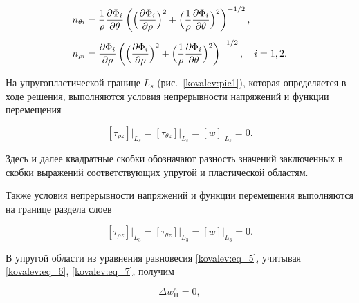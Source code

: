 \begin{equation}\label{kovalev:eq_16}

  \begin{array}{l}

    n_{\theta i}=\dfrac1{\rho}\dfrac{\partial\Phi_i}{\partial\theta}

    \left(\Bigl(\dfrac{\partial\Phi_i}{\partial\rho}\Bigr)^2+

    \Bigl(\dfrac1{\rho}\dfrac{\partial\Phi_i}{\partial\theta}\Bigr)^2\right)^{-1/2},\\[5mm]

    n_{\rho i}=\dfrac{\partial\Phi_i}{\partial\rho}

    \left(\Bigl(\dfrac{\partial\Phi_i}{\partial\rho}\Bigr)^2+

    \Bigl(\dfrac1{\rho}\dfrac{\partial\Phi_i}{\partial\theta}\Bigr)^2\right)^{-1/2}, \quad i= 1, 2.

  \end{array}

\end{equation}



На упругопластической границе  $L_s$ (рис.~\ref{kovalev:pic1}), которая определяется в ходе решения, выполняются условия непрерывности напряжений и функции перемещения

 \begin{equation}

\label{kovalev:eq_17}

  [\tau_{\rho z}]\bigr|_{L_s}=[\tau_{\theta z}]\bigr|_{L_s}=[w]\bigr|_{L_s}=0.

 \end{equation}

 Здесь и далее квадратные скобки обозначают разность значений  заключенных в скобки выражений соответствующих упругой и пластической областям.

Также условия непрерывности напряжений и функции перемещения выполняются на границе раздела слоев

 \begin{equation}\label{kovalev:eq_18}

  [\tau_{\rho z}]\bigr|_{L_3}=[\tau_{\theta z}]\bigr|_{L_3}=[w]\bigr|_{L_3}=0.

 \end{equation}

В упругой области из уравнения равновесия \eqref{kovalev:eq_5}, учитывая \eqref{kovalev:eq_6}, \eqref{kovalev:eq_7}, получим

\begin{equation}

\label{kovalev:eq_19}

  \Delta w_{\mathrm{II}}^e=0,

\end{equation}

